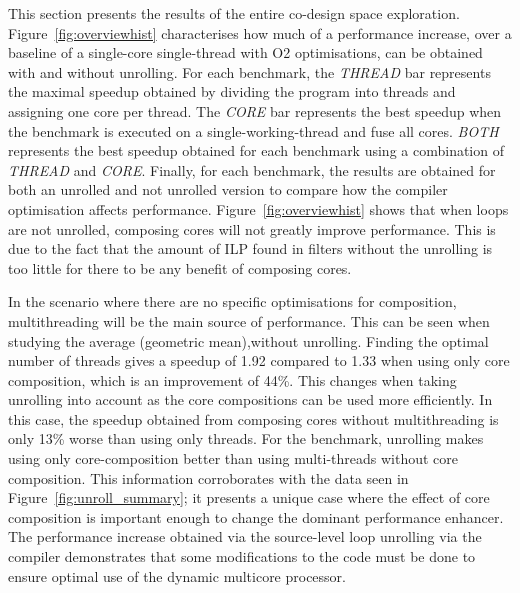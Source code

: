 This section  presents the results of the entire co-design space exploration.
Figure~\ref{fig:overviewhist} characterises how much of a performance increase, over a baseline of a single-core single-thread with O2 optimisations, can be obtained with and without unrolling.
For each benchmark, the \textit{THREAD} bar represents the maximal speedup obtained by dividing the program into threads and assigning one core per thread.
The \textit{CORE} bar represents the best speedup when the benchmark is executed on a single-working-thread and fuse all cores.
\textit{BOTH} represents the best speedup obtained for each benchmark using a combination of \textit{THREAD} and \textit{CORE}.
Finally, for each benchmark, the results are obtained for both an unrolled and not unrolled version to compare how the compiler optimisation affects performance.
Figure~\ref{fig:overviewhist} shows that when loops are not unrolled, composing cores will not greatly improve performance.
This is due to the fact that the amount of ILP found in filters without the unrolling is too little for there to be any benefit of composing cores.

In the scenario where there are no specific optimisations for composition, multithreading will be the main source of performance.
This can be seen when studying the average (geometric mean),without unrolling.
Finding the optimal number of threads gives a speedup of 1.92 compared to 1.33 when using only core composition, which is an improvement of 44\%.
This changes when taking unrolling into account as the core compositions can be used more efficiently.
In this case, the speedup obtained from composing cores without multithreading is only 13\% worse than using only threads.
For the  benchmark, unrolling makes using only core-composition better than using multi-threads without core composition.
This information corroborates with the data seen in Figure~\ref{fig:unroll_summary}; it presents a unique case where the effect of core composition is important enough to change the dominant performance enhancer.
The performance increase obtained via the source-level loop unrolling via the compiler demonstrates that some modifications to the code must be done to ensure optimal use of the dynamic multicore processor.

